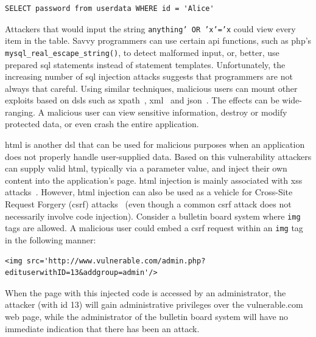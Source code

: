 \documentclass[10pt,journal,compsoc]{IEEEtran}
\begin{document}
\lstset{language=SQL}
\begin{lstlisting}
SELECT password from userdata WHERE id = 'Alice'
\end{lstlisting}

\noindent
Attackers that would input the string {\tt anything' OR 'x'='x}
could view every item in the table.
Savvy programmers can use certain {\sc api} functions, such as {\sc php}'s
{\tt mysql\_real\_escape\_string()}, to detect malformed input, or,
better, use prepared {\sc sql} statements instead of statement
templates. Unfortunately, the increasing number of {\sc sql} injection
attacks suggests that programmers are not always that careful. Using
similar techniques, malicious users can mount other exploits based on
{\sc dsl}s such as {\sc xp}ath~\cite{SW06}, {\sc
  xml}~\cite{MSM13} and {\sc json}~\cite{SMS13}. The effects can be
wide-ranging. A malicious user can view sensitive information, destroy
or modify protected data, or even crash the entire application.

{\sc html} is another {\sc dsl} that can be used for malicious
purposes when an application does not properly handle user-supplied
data. Based on this vulnerability attackers can supply valid {\sc
  html}, typically via a parameter value, and inject their own content
into the application's page. {\sc html} injection is mainly associated
with {\sc xss} attacks~\cite{SLMS14}. However, {\sc html} injection
can also be used as a vehicle for Cross-Site Request Forgery
({\sc csrf}) attacks~\cite{LZRL09}
(even though a common {\sc csrf} attack does not necessarily
involve code injection).
Consider a bulletin board system where {\tt img} tags are allowed.
A malicious user could embed a {\sc csrf} request within an
{\tt img} tag in the following manner:

\lstset{language=HTML}
\begin{lstlisting}
<img src='http://www.vulnerable.com/admin.php?edituserwithID=13&addgroup=admin'/>
\end{lstlisting}

\noindent
When the page with this injected code is accessed by an administrator,
the attacker (with {\sc id} 13) will gain administrative privileges
over the vulnerable.com web page,
while the administrator of the bulletin board system
will have no immediate indication that there has been an attack.
\end{document}
